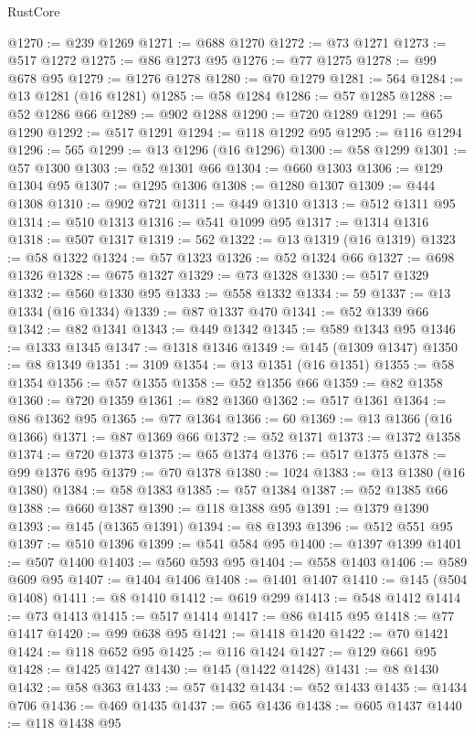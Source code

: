 \begin{lexlean}{RustCore}
\begin{coremodule}
@1270 := @239 @1269
@1271 := @688 @1270
@1272 := @73 @1271
@1273 := @517 @1272
@1275 := @86 @1273 @95
@1276 := @77 @1275
@1278 := @99 @678 @95
@1279 := @1276 @1278
@1280 := @70 @1279
@1281 := 564
@1284 := @13 @1281 (@16 @1281)
@1285 := @58 @1284
@1286 := @57 @1285
@1288 := @52 @1286 @66
@1289 := @902 @1288
@1290 := @720 @1289
@1291 := @65 @1290
@1292 := @517 @1291
@1294 := @118 @1292 @95
@1295 := @116 @1294
@1296 := 565
@1299 := @13 @1296 (@16 @1296)
@1300 := @58 @1299
@1301 := @57 @1300
@1303 := @52 @1301 @66
@1304 := @660 @1303
@1306 := @129 @1304 @95
@1307 := @1295 @1306
@1308 := @1280 @1307
@1309 := @444 @1308
@1310 := @902 @721
@1311 := @449 @1310
@1313 := @512 @1311 @95
@1314 := @510 @1313
@1316 := @541 @1099 @95
@1317 := @1314 @1316
@1318 := @507 @1317
@1319 := 562
@1322 := @13 @1319 (@16 @1319)
@1323 := @58 @1322
@1324 := @57 @1323
@1326 := @52 @1324 @66
@1327 := @698 @1326
@1328 := @675 @1327
@1329 := @73 @1328
@1330 := @517 @1329
@1332 := @560 @1330 @95
@1333 := @558 @1332
@1334 := 59
@1337 := @13 @1334 (@16 @1334)
@1339 := @87 @1337 @470
@1341 := @52 @1339 @66
@1342 := @82 @1341
@1343 := @449 @1342
@1345 := @589 @1343 @95
@1346 := @1333 @1345
@1347 := @1318 @1346
@1349 := @145 (@1309 @1347)
@1350 := @8 @1349
@1351 := 3109
@1354 := @13 @1351 (@16 @1351)
@1355 := @58 @1354
@1356 := @57 @1355
@1358 := @52 @1356 @66
@1359 := @82 @1358
@1360 := @720 @1359
@1361 := @82 @1360
@1362 := @517 @1361
@1364 := @86 @1362 @95
@1365 := @77 @1364
@1366 := 60
@1369 := @13 @1366 (@16 @1366)
@1371 := @87 @1369 @66
@1372 := @52 @1371
@1373 := @1372 @1358
@1374 := @720 @1373
@1375 := @65 @1374
@1376 := @517 @1375
@1378 := @99 @1376 @95
@1379 := @70 @1378
@1380 := 1024
@1383 := @13 @1380 (@16 @1380)
@1384 := @58 @1383
@1385 := @57 @1384
@1387 := @52 @1385 @66
@1388 := @660 @1387
@1390 := @118 @1388 @95
@1391 := @1379 @1390
@1393 := @145 (@1365 @1391)
@1394 := @8 @1393
@1396 := @512 @551 @95
@1397 := @510 @1396
@1399 := @541 @584 @95
@1400 := @1397 @1399
@1401 := @507 @1400
@1403 := @560 @593 @95
@1404 := @558 @1403
@1406 := @589 @609 @95
@1407 := @1404 @1406
@1408 := @1401 @1407
@1410 := @145 (@504 @1408)
@1411 := @8 @1410
@1412 := @619 @299
@1413 := @548 @1412
@1414 := @73 @1413
@1415 := @517 @1414
@1417 := @86 @1415 @95
@1418 := @77 @1417
@1420 := @99 @638 @95
@1421 := @1418 @1420
@1422 := @70 @1421
@1424 := @118 @652 @95
@1425 := @116 @1424
@1427 := @129 @661 @95
@1428 := @1425 @1427
@1430 := @145 (@1422 @1428)
@1431 := @8 @1430
@1432 := @58 @363
@1433 := @57 @1432
@1434 := @52 @1433
@1435 := @1434 @706
@1436 := @469 @1435
@1437 := @65 @1436
@1438 := @605 @1437
@1440 := @118 @1438 @95

\end{coremodule}
\end{lexlean}
